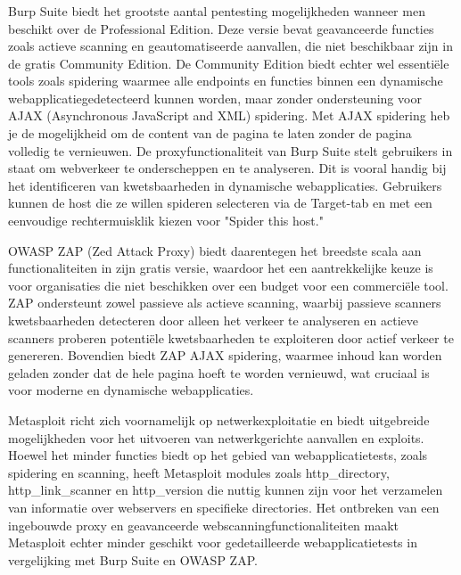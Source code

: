 \subsubsection{}
Burp Suite biedt het grootste aantal pentesting mogelijkheden wanneer men beschikt over de Professional Edition. Deze 
versie bevat geavanceerde functies zoals actieve scanning en geautomatiseerde aanvallen, die niet beschikbaar zijn in de 
gratis Community Edition. De Community Edition biedt echter wel essentiële tools zoals spidering waarmee alle endpoints 
en functies binnen een dynamische webapplicatiegedetecteerd kunnen worden, maar zonder ondersteuning 
voor AJAX (Asynchronous JavaScript and XML) spidering. Met AJAX spidering heb je de mogelijkheid om de content van de pagina 
te laten zonder de pagina volledig te vernieuwen. De proxyfunctionaliteit van Burp Suite stelt gebruikers in staat om webverkeer te onderscheppen en te 
analyseren. Dit is vooral handig bij het identificeren van kwetsbaarheden in dynamische webapplicaties. Gebruikers kunnen de 
host die ze willen spideren selecteren via de Target-tab en met een eenvoudige rechtermuisklik kiezen voor "Spider this host."

OWASP ZAP (Zed Attack Proxy) biedt daarentegen het breedste scala aan functionaliteiten in zijn gratis versie, waardoor het 
een aantrekkelijke keuze is voor organisaties die niet beschikken over een budget voor een commerciële tool. ZAP ondersteunt zowel 
passieve als actieve scanning, waarbij passieve scanners kwetsbaarheden detecteren door alleen het verkeer te analyseren en 
actieve scanners proberen potentiële kwetsbaarheden te exploiteren door actief verkeer te genereren. Bovendien biedt ZAP AJAX 
spidering, waarmee inhoud kan worden geladen zonder dat de hele pagina hoeft te worden vernieuwd, wat cruciaal is voor 
moderne en dynamische webapplicaties.

Metasploit richt zich voornamelijk op netwerkexploitatie en biedt uitgebreide mogelijkheden voor het uitvoeren van netwerkgerichte 
aanvallen en exploits. Hoewel het minder functies biedt op het gebied van webapplicatietests, zoals spidering en scanning, 
heeft Metasploit modules zoals http\_directory, http\_link\_scanner en http\_version die nuttig kunnen zijn voor het verzamelen 
van informatie over webservers en specifieke directories. Het ontbreken van een ingebouwde proxy en geavanceerde 
webscanningfunctionaliteiten maakt Metasploit echter minder geschikt voor gedetailleerde webapplicatietests in vergelijking 
met Burp Suite en OWASP ZAP.

